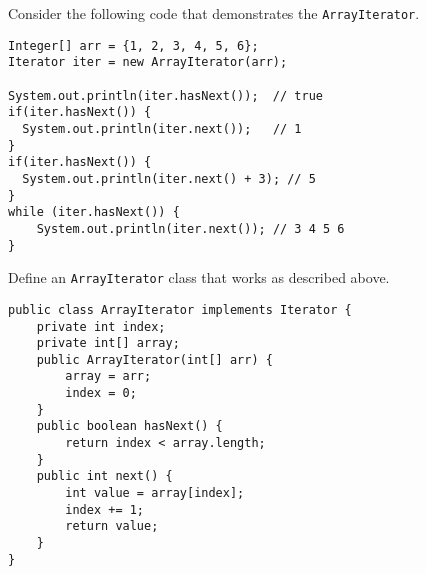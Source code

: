 \question Consider the following code that demonstrates the
\lstinline$ArrayIterator$.

\begin{lstlisting}
Integer[] arr = {1, 2, 3, 4, 5, 6};
Iterator iter = new ArrayIterator(arr);

System.out.println(iter.hasNext());  // true
if(iter.hasNext()) {
  System.out.println(iter.next());   // 1
}
if(iter.hasNext()) {
  System.out.println(iter.next() + 3); // 5
}
while (iter.hasNext()) {
    System.out.println(iter.next()); // 3 4 5 6
}
\end{lstlisting}
Define an \lstinline$ArrayIterator$ class that works as described above.
\begin{solution}[3in]
\begin{blocksection}
\begin{lstlisting}
public class ArrayIterator implements Iterator {
    private int index;
    private int[] array;
    public ArrayIterator(int[] arr) {
        array = arr;
        index = 0;
    }
    public boolean hasNext() {
        return index < array.length;
    }
    public int next() {
        int value = array[index];
        index += 1;
        return value;
    }
}
\end{lstlisting}
\end{blocksection}
\end{solution}

